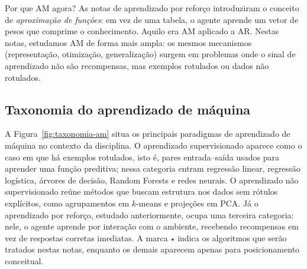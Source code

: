 \documentclass[12pt,a4paper]{article}
\begin{document}
\begin{notabox}{Por que AM agora?}
As notas de aprendizado por reforço introduziram o conceito de \emph{aproximação de funções}: em vez de uma tabela, o agente aprende um vetor de pesos que comprime o conhecimento. Aquilo era AM aplicado a AR. Nestas notas, estudamos AM de forma mais ampla: os mesmos mecanismos (representação, otimização, generalização) surgem em problemas onde o sinal de aprendizado não são recompensas, mas exemplos rotulados ou dados não rotulados.
\end{notabox}

\subsection{Taxonomia do aprendizado de máquina}

A Figura~\ref{fig:taxonomia-am} situa os principais paradigmas de aprendizado de máquina no contexto da disciplina. O aprendizado supervisionado aparece como o caso em que há exemplos rotulados, isto é, pares entrada--saída usados para aprender uma função preditiva; nessa categoria entram regressão linear, regressão logística, árvores de decisão, Random Forests e redes neurais. O aprendizado não supervisionado reúne métodos que buscam estrutura nos dados sem rótulos explícitos, como agrupamentos em $k$-means e projeções em PCA. Já o aprendizado por reforço, estudado anteriormente, ocupa uma terceira categoria: nele, o agente aprende por interação com o ambiente, recebendo recompensas em vez de respostas corretas imediatas. A marca $\star$ indica os algoritmos que serão tratados nestas notas, enquanto os demais aparecem apenas para posicionamento conceitual.
\end{document}
